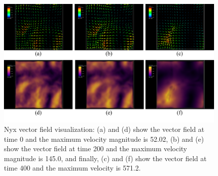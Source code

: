 \begin{figure}[h]
\centering
\includegraphics[width=1\linewidth, trim={0cm 1.1cm 0cm 0cm}, clip]{images/Nyx_vectorfields.pdf}
\vspace{-5mm}
\caption{Nyx vector field visualization: (a) and (d) show the vector field at time 0 and the maximum velocity magnitude is 52.02, (b) and (e) show the vector field at time 200 and the maximum velocity magnitude is 145.0, and finally, (c) and (f) show the vector field at time 400 and the maximum velocity is 571.2.}
\label{fig:vectorfield_nyx}
\vspace{-3mm}
\end{figure}


